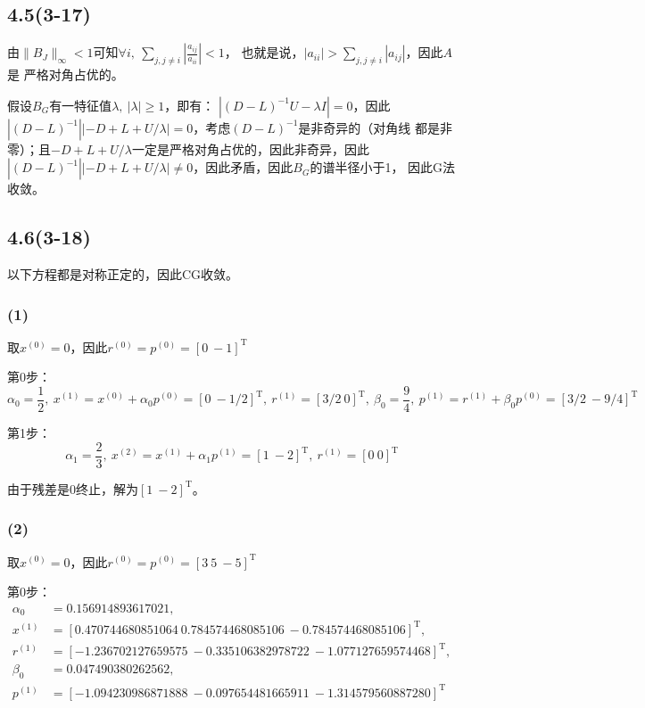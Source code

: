\documentclass[UTF8,zihao=5]{ctexart}
\newcommand{\trans}[0]{^\mathrm{T}}
\begin{document}
\subsection*{4.5(3-17)}

由$\|B_J\|_\infty<1$可知$\forall i,\ \sum_{j,j\neq i}{\left|\frac{a_{ij}}{a_{ii}}\right|}<1$，
也就是说，$|a_{ii}| > \sum_{j,j\neq i}{|a_{ij}|}$，因此$A$是
严格对角占优的。

假设$B_G$有一特征值$\lambda,\ |\lambda| \geq 1$，即有：
$|(D-L)^{-1}U - \lambda I|=0$，因此
$|(D-L)^{-1}||-D+L+U/\lambda|=0$，考虑$(D-L)^{-1}$是非奇异的（对角线
都是非零）；且$-D+L+U/\lambda$一定是严格对角占优的，因此非奇异，因此
$|(D-L)^{-1}||-D+L+U/\lambda|\neq 0$，因此矛盾，因此$B_G$的谱半径小于1，
因此G法收敛。

\subsection*{4.6(3-18)}

以下方程都是对称正定的，因此CG收敛。

\subsubsection*{(1)}

取$x^{(0)}=0$，因此$r^{(0)}=p^{(0)}=[0\ -1]\trans$

第0步：
$$
    \alpha_0=\frac{1}{2},\
    x^{(1)} = x^{(0)} + \alpha_0p^{(0)}=[0\ -1/2]\trans,\
    r^{(1)} = [3/2\ 0]\trans,\
    \beta_0 = \frac{9}{4},\
    p^{(1)} = r^{(1)} + \beta_0p^{(0)}=[3/2\ -9/4]\trans
$$

第1步：
$$
    \alpha_1=\frac{2}{3},\
    x^{(2)} = x^{(1)} + \alpha_1p^{(1)}=[1\ -2]\trans,\
    r^{(1)} = [0\ 0]\trans
$$

由于残差是0终止，解为$[1\ -2]\trans$。

\subsubsection*{(2)}

取$x^{(0)}=0$，因此$r^{(0)}=p^{(0)}=[3\ 5\ -5]\trans$

第0步：
$$
    \begin{aligned}
        \alpha_0 & = 0.156914893617021,                                                  \\
        x^{(1)}  & =[0.470744680851064\ 0.784574468085106\ -0.784574468085106]\trans,    \\
        r^{(1)}  & = [-1.236702127659575\ -0.335106382978722\ -1.077127659574468]\trans, \\
        \beta_0  & = 0.047490380262562,                                                  \\
        p^{(1)}  & =[-1.094230986871888\ -0.097654481665911\ -1.314579560887280]\trans   \\
    \end{aligned}
$$
\end{document}
